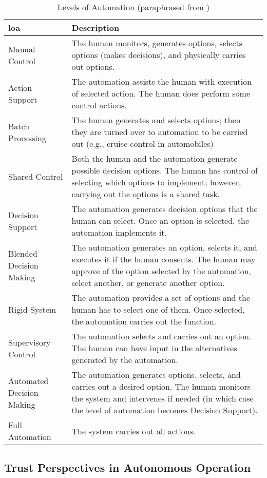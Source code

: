 \begin{table}\centering
  \caption[Levels of Automation]{Levels of Automation (paraphrased from \citet{Endsley1999})}
  \label{tab:autonomy_levels_endsley}
  \begin{tabularx}{\textwidth}{p{3cm} X}\toprule
    \gls{loa} & Description \\ \midrule
    Manual Control &
    The human monitors, generates options, selects options (makes decisions), and physically carries out options.\\
    Action Support &
    The automation assists the human with execution of selected action. The human does perform some control actions.\\
    Batch Processing &
    The human generates and selects options; then they are turned over to automation to be carried out (e.g., cruise control in automobiles)\\
    Shared Control &
    Both the human and the automation generate possible decision options. The human has control of selecting which options to implement; however, carrying out the options is a shared task.\\
    Decision Support &
    The automation generates decision options that the human can select. Once an option is selected, the automation implements it.\\
    Blended Decision Making & 
    The automation generates an option, selects it, and executes it if the human consents. The human may approve of the option selected by the automation, select another, or generate another option.\\
    Rigid System &      
    The automation provides a set of options and the human has to select one of them. Once selected, the automation carries out the function.\\
    Supervisory Control &
    The automation selects and carries out an option. The human can have input in the alternatives generated by the automation.\\
    Automated Decision Making & 
    The automation generates options, selects, and carries out a desired option. The human monitors the system and intervenes if needed (in which case the level of automation becomes Decision Support).\\
    Full Automation &   The system carries out all actions.\\ \bottomrule
  \end{tabularx}
\end{table}


\subsection{Trust Perspectives in Autonomous Operation}\label{sec:trust_perspectives}

